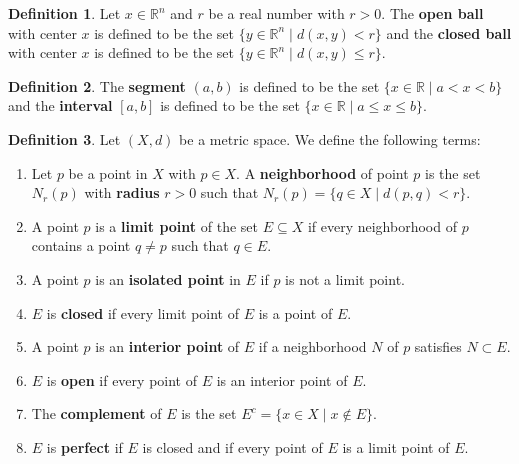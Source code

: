 \documentclass[12pt]{article}
\theoremstyle{definition}
\newtheorem{definition}{Definition}
\theoremstyle{named}
\newcounter{customDef}
\begin{document}
\setcounter{customDef}{0}
\renewcommand{\thedefinition}{of Open/Closed Ball}
\begin{definition}
    Let $x \in \mathbb{R}^n$ and $r$ be a real number with $r>0$. The \textbf{open ball} with center $x$ is defined to be the set $\{y \in \mathbb{R}^n \mid d(x,y) < r\}$ and the \textbf{closed ball} with center $x$ is defined to be the set $\{y \in \mathbb{R}^n \mid d(x,y) \leq r\}$.
\end{definition}

\setcounter{customDef}{0}
\renewcommand{\thedefinition}{2.17}
\begin{definition}
    The \textbf{segment} $(a,b)$ is defined to be the set $\{x \in \mathbb{R} \mid a < x < b\}$ and the \textbf{interval} $[a,b]$ is defined to be the set $\{x \in \mathbb{R} \mid a \leq x \leq b\}$.
\end{definition}

\setcounter{customDef}{0}
\renewcommand{\thedefinition}{2.18}
\begin{definition}
    Let $(X,d)$ be a metric space. We define the following terms: 
    \begin{enumerate}
        \item Let $p$ be a point in $X$ with $p \in X$. A \textbf{neighborhood} of point $p$ is the set $N_r(p)$ with \textbf{radius} $r>0$ such that $N_r(p) = \{q \in X \mid d(p,q) < r\}$. 
        \item A point $p$ is a \textbf{limit point} of the set $E \subseteq X$ if every neighborhood of $p$ contains a point $q \neq p$ such that $q \in E$. 
        \item A point $p$ is an \textbf{isolated point} in $E$ if $p$ is not a limit point. 
        \item $E$ is \textbf{closed} if every limit point of $E$ is a point of $E$. 
        \item A point $p$ is an \textbf{interior point} of $E$ if a neighborhood $N$ of $p$ satisfies $N \subset E$. 
        \item $E$ is \textbf{open} if every point of $E$ is an interior point of $E$. 
        \item The \textbf{complement} of $E$ is the set $E^c = \{x \in X \mid x \notin E\}$. 
        \item $E$ is \textbf{perfect} if $E$ is closed and if every point of $E$ is a limit point of $E$. 
    \end{enumerate}
\end{definition}
\end{document}
